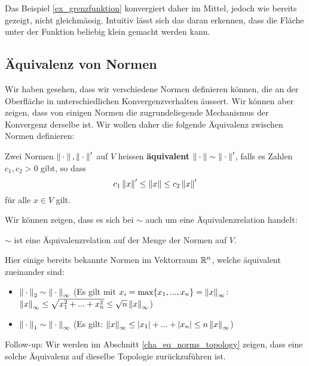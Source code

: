 Das Beispiel \ref{ex_grenzfunktion} konvergiert daher im Mittel, jedoch wie bereits gezeigt, nicht gleichmässig. Intuitiv lässt sich das daran erkennen, dass die Fläche unter der Funktion beliebig klein gemacht werden kann.

\subsection{Äquivalenz von Normen}\label{cha_eq_norms}
Wir haben gesehen, dass wir verschiedene Normen definieren können, die an der Oberfläche in unterschiedlichen Konvergenzverhalten äussert. Wir können aber zeigen, dass von einigen Normen die zugrundeliegende Mechanismus der Konvergenz derselbe ist. Wir wollen daher die folgende Äquivalenz zwischen Normen definieren:
\begin{definition}{}{}
Zwei Normen $\left\|\:\cdot\:\right\|, \left\|\:\cdot\:\right\|'$ auf $V$ heissen \textbf{äquivalent} $\left\|\:\cdot\:\right\| \sim \left\|\:\cdot\:\right\|'$, falls es Zahlen $c_1, c_2 > 0$ gibt, so dass
$$c_1 \left\|x\right\|' \leq \left\|x\right\| \leq c_2 \left\|x\right\|'$$
für alle $x \in V$ gilt.
\end{definition}
Wir können zeigen, dass es sich bei $\sim$ auch um eine Äquivalenzrelation handelt:
\begin{exercise}[Äquivalenzrelation] $\sim$ ist eine Äquivalenzrelation auf der Menge der Normen auf $V$. 
\end{exercise}

\begin{example} Hier einige bereits bekannte Normen im Vektorraum $\mathbb{R}^n$, welche äquivalent zueinander sind:
\begin{itemize}
    \item $\left\|\:\cdot\:\right\|_2 \sim \left\|\:\cdot\:\right\|_\infty$ (Es gilt mit $x_i = \max \{x_1, ..., x_n\} = \left\|x\right\|_\infty $: $\left\|x\right\|_\infty \leq \sqrt{x_1^2 +...+x_n^2} \leq \sqrt{n} \left\|x\right\|_\infty$)
    \item $\left\|\:\cdot\:\right\|_1 \sim \left\|\:\cdot\:\right\|_\infty$ (Es gilt: $\left\|x\right\|_\infty \leq \left|x_1\right|+...+\left|x_n\right| \leq n \left\|x\right\|_\infty$)
\end{itemize}

\end{example}

Follow-up: Wir werden im  Abschnitt \ref{cha_eq_norms_topology} zeigen, dass eine solche Äquivalenz auf dieselbe Topologie zurückzuführen ist.

